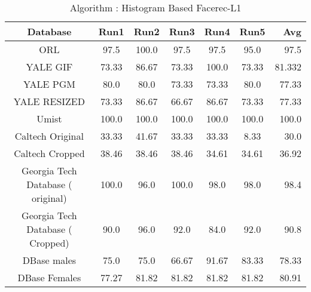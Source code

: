 \documentclass[10pt,a4paper]{article}
\begin{document}
\begin{center}
\begin{table}
\caption{Algorithm : Histogram Based Facerec-L1 }
\centering
\begin{tabular}{| c | c | c | c | c | c | r | } \hline 
Database & Run1 & Run2 & Run3 & Run4 & Run5 & Avg  \\  
\hline
ORL & 97.5 & 100.0 & 97.5 & 97.5 & 95.0 & 97.5 \\
\hline
YALE GIF & 73.33 & 86.67 & 73.33 & 100.0 & 73.33 & 81.332 \\
\hline
YALE PGM & 80.0 & 80.0 & 73.33 & 73.33 & 80.0 & 77.33 \\
\hline
YALE RESIZED & 73.33 & 86.67 & 66.67 & 86.67 & 73.33 & 77.33 \\
\hline
Umist & 100.0 & 100.0 & 100.0 & 100.0 & 100.0 & 100.0 \\
\hline
Caltech Original & 33.33 & 41.67 & 33.33 & 33.33 & 8.33 & 30.0 \\
\hline
Caltech Cropped & 38.46 & 38.46 & 38.46 & 34.61 & 34.61 & 36.92 \\
\hline
Georgia Tech Database ( original) & 100.0 & 96.0 & 100.0 & 98.0 & 98.0 & 98.4 \\
\hline
Georgia Tech Database ( Cropped) & 90.0 & 96.0 & 92.0 & 84.0 & 92.0 & 90.8 \\
\hline
DBase males & 75.0 & 75.0 & 66.67 & 91.67 & 83.33 & 78.33 \\
\hline
DBase Females  & 77.27 & 81.82 & 81.82 & 81.82 & 81.82 & 80.91 \\
\hline
\end{tabular}
\end{table} 



\end{center}
\end{document}

